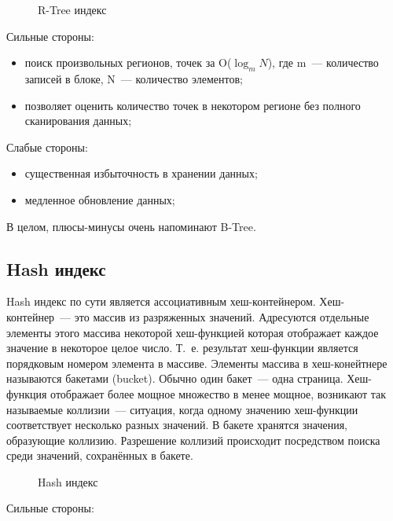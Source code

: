 \begin{figure}[ht!]
  \caption{R-Tree индекс}
  \label{fig:rtree_index}
\end{figure}

Сильные стороны:

\begin{itemize}
  \item поиск произвольных регионов, точек за O($\log_m{N}$), где m~--- количество записей в блоке, N~--- количество элементов;
  \item позволяет оценить количество точек в некотором регионе без полного сканирования данных;
\end{itemize}

Слабые стороны:

\begin{itemize}
  \item существенная избыточность в хранении данных;
  \item медленное обновление данных;
\end{itemize}

В целом, плюсы-минусы очень напоминают B-Tree.




\subsection{Hash индекс}

Hash индекс по сути является ассоциативным хеш-контейнером. Хеш-контейнер~--- это массив из разряженных значений. Адресуются отдельные элементы этого массива некоторой хеш-функцией которая отображает каждое значение в некоторое целое число. Т.~е. результат хеш-функции является порядковым номером элемента в массиве. Элементы массива в хеш-конейтнере называются бакетами (bucket). Обычно один бакет~--- одна страница. Хеш-функция отображает более мощное множество в менее мощное, возникают так называемые коллизии~--- ситуация, когда одному значению хеш-функции соответствует несколько разных значений. В бакете хранятся значения, образующие коллизию. Разрешение коллизий происходит посредством поиска среди значений, сохранённых в бакете.

\begin{figure}[ht!]
  \caption{Hash индекс}
  \label{fig:hash_index}
\end{figure}

Сильные стороны:

